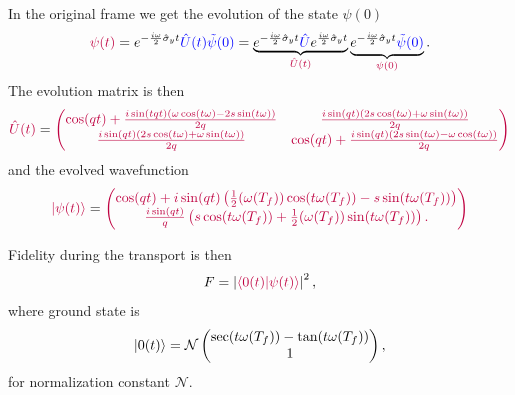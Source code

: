 In the original frame we get the evolution of the state $\psi(0)$
\begin{equation}
    \textcolor{purple}{\psi(t)}=e^{-\frac{i \omega}{2}\hat\sigma_y t} \textcolor{blue}{\hat U(t) \tilde\psi(0)} = \underbrace{e^{-\frac{i \omega}{2}\hat\sigma_y t} \textcolor{blue}{\hat U}e^{\frac{i \omega}{2}\hat\sigma_y t}}_{\textcolor{purple}{\hat U(t)}} \underbrace{e^{-\frac{i \omega}{2}\hat\sigma_y t} \textcolor{blue}{\tilde\psi(0)}}_{\textcolor{purple}{\psi(0)}}.
\end{equation}
The evolution matrix is then
\begin{equation}
    \textcolor{purple}{\hat U(t)}=\textcolor{purple}{\begin{pmatrix}
         \cos (q t)+\frac{i \sin (tqt) (\omega  \cos (t \omega )-2 s \sin (t \omega ))}{2 q} & \frac{i \sin (qt) (2 s \cos (t \omega )+\omega  \sin (t \omega ))}{2 q} \\
         \frac{i \sin (qt) (2 s \cos (t \omega )+\omega  \sin (t \omega ))}{2 q} & \cos (qt)+\frac{i \sin (qt) (2 s \sin (t \omega )-\omega  \cos (t \omega ))}{2 q} \\
        \end{pmatrix}}
\end{equation}
and the evolved wavefunction
\begin{equation}
    \textcolor{purple}{\ket{\psi(t)}}=\textcolor{purple}{\begin{pmatrix}
        \cos (qt)+i \sin (qt) \left(\frac{1}{2} (\omega(T_f) ) \cos (t \omega(T_f) )-s \sin (t \omega(T_f) )\right)\\
        \frac{i \sin (qt)}{q} \left(s \cos (t \omega(T_f) )+\frac{1}{2} (\omega(T_f) ) \sin (t \omega(T_f) )\right).
    \end{pmatrix}}
\end{equation}

Fidelity during the transport is then
\begin{equation}
    F=\left|\textcolor{purple}{\braket{0(t)|\psi(t)}}\right|^2,
\end{equation}
where ground state is
\begin{equation}
    \ket{0(t)}=\mathcal{N}\begin{pmatrix}
        \sec (t \omega (T_f))-\tan (t \omega (T_f))\\
        1
    \end{pmatrix},
\end{equation}
for normalization constant $\mathcal{N}$.